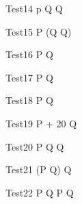 \begin{circus}
   \circprocess Test14 \circdef  p \circseq Q \circendby {} \rcirctime \circseq Q \\
\end{circus}

\begin{circus}
   \circprocess Test15 \circdef  P \circseq (Q \circendby {} \rcirctime \circseq Q)\\
\end{circus}

\begin{circus}
   \circprocess Test16 \circdef  P \circendby {} \rcirctime  \circseq Q \circendby {} \rcirctime\\
\end{circus}


\begin{circus}
   \circprocess Test17 \circdef  P \circtimeout {} \rcirctime Q  \\
\end{circus}

\begin{circus}
   \circprocess Test18 \circdef  P \circtimeout {}  \rcirctime Q \\
\end{circus}

\begin{circus}
   \circprocess Test19 \circdef  P \circtimeout {} + 20 \rcirctime Q  \\
\end{circus}


\begin{circus}
   \circprocess Test20 \circdef  P \circseq Q \circtimeout {} \rcirctime Q  \\
\end{circus}

\begin{circus}
   \circprocess Test21 \circdef  (P \circseq Q) \circtimeout {} \rcirctime Q \\
\end{circus}

\begin{circus}
   \circprocess Test22 \circdef  P \circseq Q \circtimeout {} \rcirctime  P \circseq Q \\
\end{circus}

